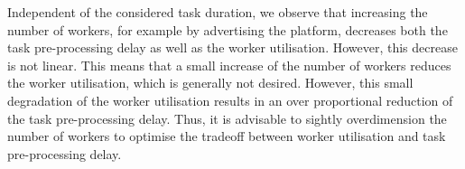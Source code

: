 Independent of the considered task duration, we observe that increasing the number of workers, for example by advertising the platform, decreases both the task pre-processing delay as well as the worker utilisation.
However, this decrease is not linear.
This means that a small increase of the number of workers reduces the worker utilisation, which is generally not desired.
However, this small degradation of the worker utilisation results in an over proportional reduction of the task pre-processing delay.
Thus, it is advisable to sightly overdimension the number of workers to optimise the tradeoff between worker utilisation and task pre-processing delay.
